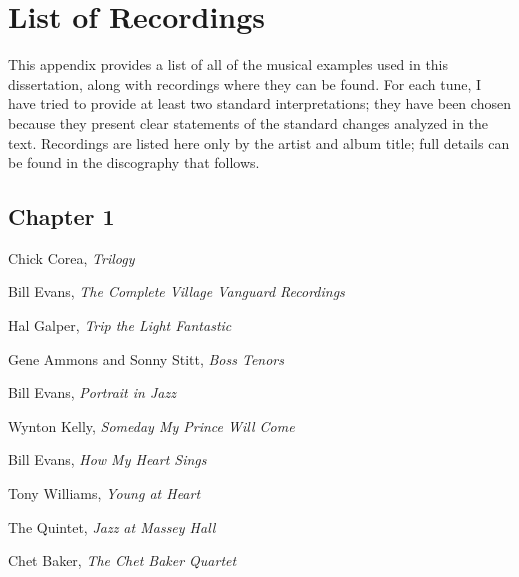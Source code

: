 \chapter*{List of Recordings}

This appendix provides a list of all of the musical examples used in this
dissertation, along with recordings where they can be found. For each tune, I
have tried to provide at least two standard interpretations; they have been
chosen because they present clear statements of the standard changes analyzed
in the text. Recordings are listed here only by the artist and album title;
full details can be found in the discography that follows.

\section*{Chapter 1}

\vspace{-1em}

\begin{compactitem}
    \item Chick Corea, \emph{Trilogy}
    \item Bill Evans, \emph{The Complete Village Vanguard Recordings}
    \item Hal Galper, \emph{Trip the Light Fantastic}
\end{compactitem}


\begin{compactitem}
    \item Gene Ammons and Sonny Stitt, \emph{Boss Tenors}
    \item Bill Evans, \emph{Portrait in Jazz}
    \item Wynton Kelly, \emph{Someday My Prince Will Come}
\end{compactitem}


\begin{compactitem}
    \item Bill Evans, \emph{How My Heart Sings}
    \item Tony Williams, \emph{Young at Heart}
\end{compactitem}

\begin{compactitem}
    \item The Quintet, \emph{Jazz at Massey Hall}
    \item Chet Baker, \emph{The Chet Baker Quartet}
\end{compactitem}

\clearpage


